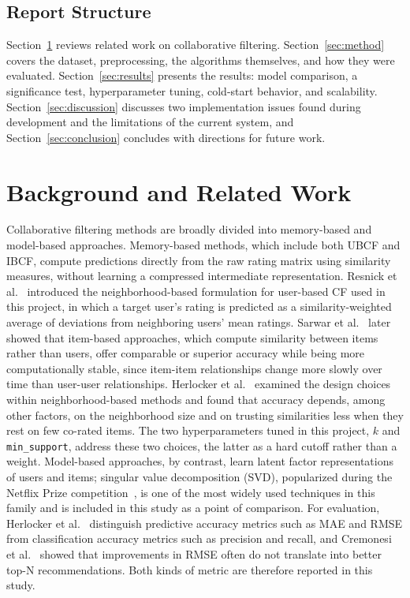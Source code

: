 \documentclass[conference]{IEEEtran}
\begin{document}
\subsection{Report Structure}
Section~\ref{sec:related} reviews related work on collaborative filtering. Section~\ref{sec:method} covers the dataset, preprocessing, the algorithms themselves, and how they were evaluated. Section~\ref{sec:results} presents the results: model comparison, a significance test, hyperparameter tuning, cold-start behavior, and scalability. Section~\ref{sec:discussion} discusses two implementation issues found during development and the limitations of the current system, and Section~\ref{sec:conclusion} concludes with directions for future work.

\section{Background and Related Work}
\label{sec:related}
Collaborative filtering methods are broadly divided into memory-based and model-based approaches. Memory-based methods, which include both UBCF and IBCF, compute predictions directly from the raw rating matrix using similarity measures, without learning a compressed intermediate representation. Resnick et al.~\cite{resnick1994} introduced the neighborhood-based formulation for user-based CF used in this project, in which a target user's rating is predicted as a similarity-weighted average of deviations from neighboring users' mean ratings. Sarwar et al.~\cite{sarwar2001} later showed that item-based approaches, which compute similarity between items rather than users, offer comparable or superior accuracy while being more computationally stable, since item-item relationships change more slowly over time than user-user relationships. Herlocker et al.~\cite{herlocker1999} examined the design choices within neighborhood-based methods and found that accuracy depends, among other factors, on the neighborhood size and on trusting similarities less when they rest on few co-rated items. The two hyperparameters tuned in this project, $k$ and \texttt{min\_support}, address these two choices, the latter as a hard cutoff rather than a weight. Model-based approaches, by contrast, learn latent factor representations of users and items; singular value decomposition (SVD), popularized during the Netflix Prize competition~\cite{koren2009}, is one of the most widely used techniques in this family and is included in this study as a point of comparison. For evaluation, Herlocker et al.~\cite{herlocker2004} distinguish predictive accuracy metrics such as MAE and RMSE from classification accuracy metrics such as precision and recall, and Cremonesi et al.~\cite{cremonesi2010} showed that improvements in RMSE often do not translate into better top-N recommendations. Both kinds of metric are therefore reported in this study.
\end{document}
